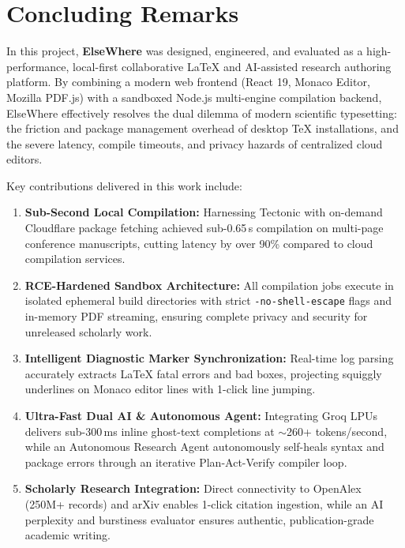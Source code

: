 \documentclass[12pt,a4paper]{article}
\newcommand{\code}[1]{\texttt{#1}}
\begin{document}
\clearpage
\section{Concluding Remarks}\label{sec:concl}

\noindent In this project, \textbf{ElseWhere} was designed, engineered, and evaluated as a high-performance, local-first collaborative \LaTeX{} and AI-assisted research authoring platform. By combining a modern web frontend (React 19, Monaco Editor, Mozilla PDF.js) with a sandboxed Node.js multi-engine compilation backend, ElseWhere effectively resolves the dual dilemma of modern scientific typesetting: the friction and package management overhead of desktop \TeX{} installations, and the severe latency, compile timeouts, and privacy hazards of centralized cloud editors.

\noindent Key contributions delivered in this work include:
\begin{enumerate}
    \item \textbf{Sub-Second Local Compilation:} Harnessing Tectonic with on-demand Cloudflare package fetching achieved sub-0.65\,s compilation on multi-page conference manuscripts, cutting latency by over 90\% compared to cloud compilation services.
    \item \textbf{RCE-Hardened Sandbox Architecture:} All compilation jobs execute in isolated ephemeral build directories with strict \code{-no-shell-escape} flags and in-memory PDF streaming, ensuring complete privacy and security for unreleased scholarly work.
    \item \textbf{Intelligent Diagnostic Marker Synchronization:} Real-time log parsing accurately extracts \LaTeX{} fatal errors and bad boxes, projecting squiggly underlines on Monaco editor lines with 1-click line jumping.
    \item \textbf{Ultra-Fast Dual AI \& Autonomous Agent:} Integrating Groq LPUs delivers sub-300\,ms inline ghost-text completions at $\sim$260+ tokens/second, while an Autonomous Research Agent autonomously self-heals syntax and package errors through an iterative Plan-Act-Verify compiler loop.
    \item \textbf{Scholarly Research Integration:} Direct connectivity to OpenAlex (250M+ records) and arXiv enables 1-click citation ingestion, while an AI perplexity and burstiness evaluator ensures authentic, publication-grade academic writing.
\end{enumerate}
\end{document}
